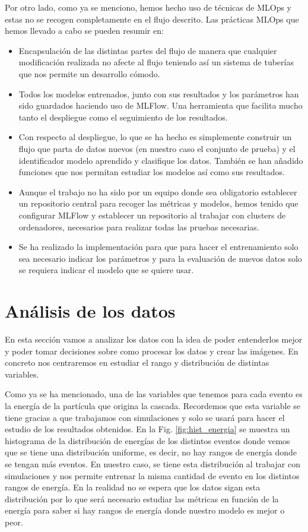 \documentclass[a4paper,12pt,twoside,titlepage]{article}
\begin{document}
Por otro lado, como ya se menciono, hemos hecho uso de técnicas de MLOps y estas no se recogen completamente en el flujo descrito. Las prácticas MLOps que hemos llevado a cabo se pueden resumir en:
\begin{itemize}
  \item Encapsulación de las distintas partes del flujo de manera que cualquier modificación realizada no afecte al flujo teniendo así un sistema de tuberías que nos permite un desarrollo cómodo.
  \item Todos los modelos entrenados, junto con sus resultados y los parámetros han sido guardados haciendo uso de MLFlow. Una herramienta que facilita mucho tanto el despliegue como el seguimiento de los resultados.
  \item Con respecto al despliegue, lo que se ha hecho es simplemente construir un flujo que parta de datos nuevos (en nuestro caso el conjunto de prueba) y el identificador modelo aprendido y clasifique los datos. También se han añadido funciones que nos permitan estudiar los modelos así como sus resultados.
  \item Aunque el trabajo no ha sido por un equipo donde sea obligatorio establecer un repositorio central para recoger las métricas y modelos, hemos tenido que configurar MLFlow y establecer un repositorio al trabajar con clusters de ordenadores, necesarios para realizar todas las pruebas necesarias.
  \item Se ha realizado la implementación para que para hacer el entrenamiento solo sea necesario indicar los parámetros y para la evaluación de nuevos datos solo se requiera indicar el modelo que se quiere usar.
\end{itemize} 
\newpage
\section{Análisis de los datos}

En esta sección vamos a analizar los datos con la idea de poder entenderlos mejor y poder tomar decisiones sobre como procesar los datos y crear las imágenes. En concreto nos centraremos en estudiar el rango y distribución de distintas variables.

Como ya se ha mencionado, una de las variables que tenemos para cada evento es la energía de la partícula que origina la cascada. Recordemos que esta variable se tiene gracias a que trabajamos con simulaciones y solo se usará para hacer el estudio de los resultados obtenidos. En la Fig. \ref{fig:hist_energia} se muestra un histograma de la distribución de energías de los distintos eventos donde vemos que se tiene una distribución uniforme, es decir, no hay rangos de energía donde se tengan más eventos. En nuestro caso, se tiene esta distribución al trabajar con simulaciones y nos permite entrenar la misma cantidad de evento en los distintos rangos de energía. En la realidad no se espera que los datos sigan esta distribución por lo que será necesario estudiar las métricas en función de la energía para saber si hay rangos de energía donde nuestro modelo es mejor o peor.
\end{document}
